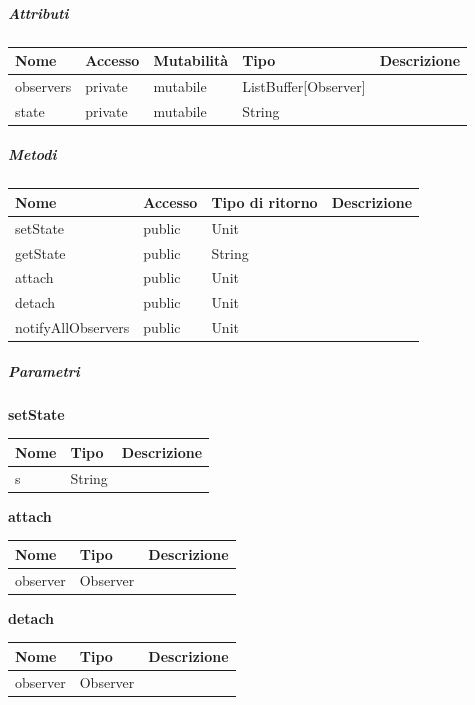 \documentclass{scalatekids-article}
\begin{document}
\subparagraph{Attributi}

\begin{tabular}{| l | l | l | l | l |}
	\hline
	Nome & Accesso & Mutabilità & Tipo & Descrizione\\
	\hline
	observers & private & mutabile & ListBuffer[Observer] & \\
	\hline
	state & private & mutabile & String & \\
	\hline
\end{tabular}

\subparagraph{Metodi}

\begin{tabular}{| l | l | l | l |}
	\hline
	Nome & Accesso & Tipo di ritorno & Descrizione\\
	\hline
	setState & public & Unit & \\
	\hline
	getState & public & String & \\
	\hline
	attach & public & Unit & \\
	\hline
	detach & public & Unit & \\
	\hline
	notifyAllObservers & public & Unit & \\
	\hline
\end{tabular}

\subparagraph{Parametri}

\begin{center}
	\textbf{setState}
\end{center}
\begin{tabular}{| l | l | l |}
	\hline
	Nome & Tipo & Descrizione\\
	\hline
	s & String & \\
	\hline
\end{tabular}

\begin{center}
	\textbf{attach}
\end{center}
\begin{tabular}{| l | l | l |}
	\hline
	Nome & Tipo & Descrizione\\
	\hline
	observer & Observer & \\
	\hline
\end{tabular}

\begin{center}
	\textbf{detach}
\end{center}
\begin{tabular}{| l | l | l |}
	\hline
	Nome & Tipo & Descrizione\\
	\hline
	observer & Observer & \\
	\hline
\end{tabular}
\end{document}
